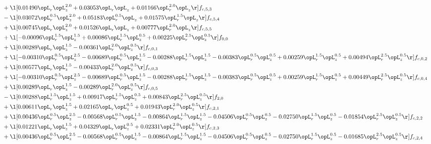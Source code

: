 \begin{alignat}{2}
& + \l[  0.01490 \opL_r \opL_z^{2.0} +  0.03053 \opL_r \opL_z +  0.01166 \opL_r^{2.0} \opL_z  \r] f_{c,5,3} \nonumber \\ 
& - \l[  0.03072 \opL_r^{0.5} \opL_z^{2.0} +  0.05183 \opL_r^{0.5} \opL_z +  0.01575 \opL_r^{1.5} \opL_z  \r] f_{c,5,4} \nonumber \\ 
& + \l[  0.00745 \opL_r \opL_z^{2.0} +  0.01526 \opL_r \opL_z +  0.00777 \opL_r^{2.0} \opL_z  \r] f_{c,5,5} \nonumber \\ 
& + \l[  -0.00096 \opL_r^{1.5} \opL_z^{1.5} +  0.00086 \opL_r^{1.5} \opL_z^{0.5} +  0.00225 \opL_r^{2.5} \opL_z^{0.5}  \r] f_{0,0} \nonumber \\ 
& + \l[  0.00289 \opL_r \opL_z^{1.5}   -0.00361 \opL_r^{2.0} \opL_z^{0.5}  \r] f_{c,0,1} \nonumber \\ 
& + \l[  -0.00310 \opL_r^{0.5} \opL_z^{2.5}   -0.00689 \opL_r^{0.5} \opL_z^{1.5}   -0.00288 \opL_r^{1.5} \opL_z^{1.5}   -0.00383 \opL_r^{0.5} \opL_z^{0.5} +  0.00259 \opL_r^{1.5} \opL_z^{0.5} +  0.00494 \opL_r^{2.5} \opL_z^{0.5}  \r] f_{c,0,2} \nonumber \\ 
& + \l[  0.00577 \opL_r \opL_z^{1.5}   -0.00433 \opL_r^{2.0} \opL_z^{0.5}  \r] f_{c,0,3} \nonumber \\ 
& + \l[  -0.00310 \opL_r^{0.5} \opL_z^{2.5}   -0.00689 \opL_r^{0.5} \opL_z^{1.5}   -0.00288 \opL_r^{1.5} \opL_z^{1.5}   -0.00383 \opL_r^{0.5} \opL_z^{0.5} +  0.00259 \opL_r^{1.5} \opL_z^{0.5} +  0.00449 \opL_r^{2.5} \opL_z^{0.5}  \r] f_{c,0,4} \nonumber \\ 
& + \l[  0.00289 \opL_r \opL_z^{1.5}   -0.00289 \opL_r^{2.0} \opL_z^{0.5}  \r] f_{c,0,5} \nonumber \\ 
& - \l[  0.00288 \opL_r^{1.5} \opL_z^{1.5} +  0.00917 \opL_r^{1.5} \opL_z^{0.5} +  0.00843 \opL_r^{2.5} \opL_z^{0.5}  \r] f_{2,0} \nonumber \\ 
& + \l[  0.00611 \opL_r \opL_z^{1.5} +  0.02165 \opL_r \opL_z^{0.5} +  0.01943 \opL_r^{2.0} \opL_z^{0.5}  \r] f_{c,2,1} \nonumber \\ 
& + \l[  0.00436 \opL_r^{0.5} \opL_z^{2.5}   -0.00568 \opL_r^{0.5} \opL_z^{1.5}   -0.00864 \opL_r^{1.5} \opL_z^{1.5}   -0.04506 \opL_r^{0.5} \opL_z^{0.5}   -0.02750 \opL_r^{1.5} \opL_z^{0.5}   -0.01854 \opL_r^{2.5} \opL_z^{0.5}  \r] f_{c,2,2} \nonumber \\ 
& + \l[  0.01221 \opL_r \opL_z^{1.5} +  0.04329 \opL_r \opL_z^{0.5} +  0.02331 \opL_r^{2.0} \opL_z^{0.5}  \r] f_{c,2,3} \nonumber \\ 
& + \l[  0.00436 \opL_r^{0.5} \opL_z^{2.5}   -0.00568 \opL_r^{0.5} \opL_z^{1.5}   -0.00864 \opL_r^{1.5} \opL_z^{1.5}   -0.04506 \opL_r^{0.5} \opL_z^{0.5}   -0.02750 \opL_r^{1.5} \opL_z^{0.5}   -0.01685 \opL_r^{2.5} \opL_z^{0.5}  \r] f_{c,2,4} \nonumber \\ 

\end{alignat}
